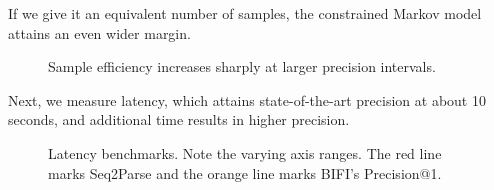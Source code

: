 If we give it an equivalent number of samples, the constrained Markov model attains an even wider margin.

\begin{figure}[H]
  \resizebox{.24\textwidth}{!}{}
  \resizebox{.24\textwidth}{!}{}
  \resizebox{.24\textwidth}{!}{}
  \resizebox{.24\textwidth}{!}{}
  \caption{Sample efficiency increases sharply at larger precision intervals.}
\end{figure}

Next, we measure latency, which attains state-of-the-art precision at about 10 seconds, and additional time results in higher precision.

\begin{figure}[H]
  \begin{center}
  \resizebox{.24\textwidth}{!}{}
  \resizebox{.24\textwidth}{!}{}
  \resizebox{.24\textwidth}{!}{}
  \end{center}
  \caption{Latency benchmarks. Note the varying axis ranges. The red line marks Seq2Parse and the orange line marks BIFI's Precision@1.}\label{fig:human}
\end{figure}